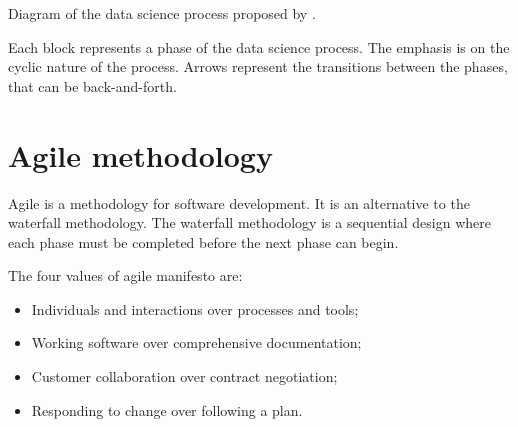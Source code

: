 \begin{figurebox}[label=fig:zumel]{Diagram of the data science process proposed by \textcite{Zumel2019}.}
  \centering

  \tcblower
  Each block represents a phase of the data science process.  The emphasis is on the
  cyclic nature of the process.  Arrows represent the transitions between the phases, that
  can be back-and-forth.
\end{figurebox}

\section{Agile methodology}

Agile is a methodology for software development.  It is an alternative to the waterfall
methodology.  The waterfall methodology is a sequential design where each phase
must be completed before the next phase can begin.

The four values of agile manifesto are:
\begin{itemize}
  \item Individuals and interactions over processes and tools;
  \item Working software over comprehensive documentation;
  \item Customer collaboration over contract negotiation;
  \item Responding to change over following a plan.
\end{itemize}

